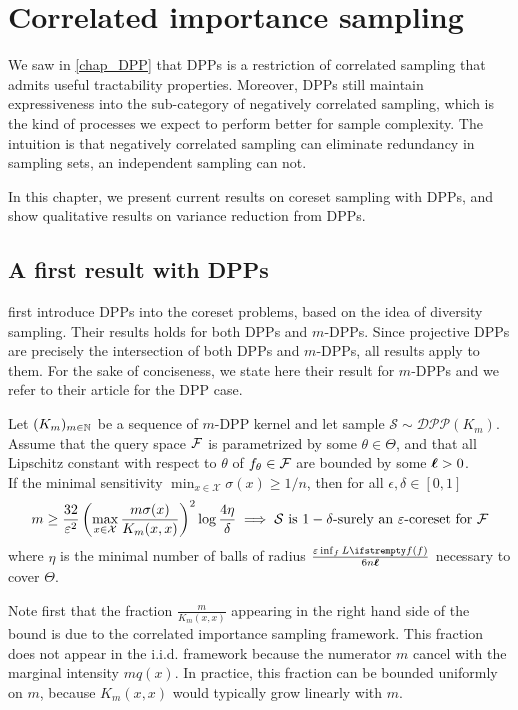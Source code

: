 \chapter{Correlated importance sampling}
\label{chap_correlated_sampling}



We saw in \cref{chap_DPP} that DPPs is a restriction of correlated sampling that admits useful tractability properties. Moreover, DPPs still maintain expressiveness into the sub-category of negatively correlated sampling, which is the kind of processes we expect to perform better for sample complexity. The intuition is that negatively correlated sampling can eliminate redundancy in sampling sets, an independent sampling can not.

In this chapter, we present current results on coreset sampling with DPPs, and show qualitative results on variance reduction from DPPs. 



\section{A first result with DPPs}


\cite{tremblay2018dppcoreset} first introduce DPPs into the coreset problems, based on the idea of diversity sampling. Their results holds for both DPPs and $m$-DPPs. Since projective DPPs are precisely the intersection of both DPPs and $m$-DPPs, all results apply to them. For the sake of conciseness, we state here their result for $m$-DPPs and we refer to their article for the DPP case.

\begin{tcolorbox}
	\begin{theorem}
		Let $(K_m)_{m\in \mathbb{N}}$ be a sequence of $m$-DPP kernel and let sample $\mathcal{S} \sim \mathcal{DPP}(K_m)$. Assume that the query space $\mathcal{F}$ is parametrized by some $\theta \in \Theta$, and that all Lipschitz constant with respect to $\theta$ of $f_\theta \in \mathcal{F}$ are bounded by some $\boldsymbol\ell>0$.\\
		If the minimal sensitivity $\min_{x\in \mathcal{X}}\sigma(x) \geq 1/n$, then for all $\epsilon, \delta \in [0,1]$ 
		\begin{equation*}
            m \geq \frac{32}{\varepsilon^{2}}\left(\max_{x\in \mathcal{X}}\frac{m\sigma(x)}{K_m(x,x)}\right)^2 \log \frac{4\eta}{\delta}
			\implies 
			\text{$\mathcal{S}$ is $1-\delta$-surely an $\varepsilon$-coreset for $\mathcal{F}$}
		\end{equation*}
		where $\eta$ is the minimal number of balls of radius $\frac{\epsilon \inf_{f}\loss{f}}{6 n \lipschitz}$ necessary to cover $\Theta$.
	\end{theorem}
\end{tcolorbox}
Note first that the fraction $\frac{m}{K_m(x,x)}$ appearing in the right hand side of the bound is due to the correlated importance sampling framework. This fraction does not appear in the i.i.d. framework because the numerator $m$ cancel with the marginal intensity $mq(x)$. In practice, this fraction can be bounded uniformly on $m$, because $K_m(x,x)$ would typically grow linearly with $m$.

